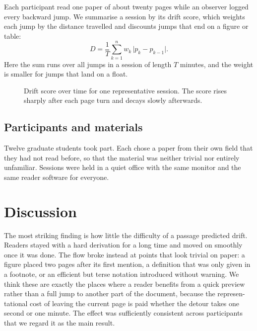 \documentclass[11pt]{article}
\begin{document}
Each participant read one paper of about twenty pages while an observer
logged every backward jump. We summarise a session by its drift score, which
weights each jump by the distance travelled and discounts jumps that end on a
figure or table:
\begin{equation}
  D = \frac{1}{T}\sum_{k=1}^{n} w_k \,\lvert p_k - p_{k-1}\rvert .
  \label{eq:drift}
\end{equation}
Here the sum runs over all jumps in a session of length $T$ minutes, and the
weight is smaller for jumps that land on a float.

\begin{figure}[H]
  \centering
  \caption{Drift score over time for one representative session. The score
  rises sharply after each page turn and decays slowly afterwards.}
  \label{fig:drift}
\end{figure}

\subsection{Participants and materials}

Twelve graduate students took part. Each chose a paper from their own field
that they had not read before, so that the material was neither trivial nor
entirely unfamiliar. Sessions were held in a quiet office with the same
monitor and the same reader software for everyone.

\clearpage

\section{Discussion}

The most striking finding is how little the difficulty of a passage predicted
drift. Readers stayed with a hard derivation for a long time and moved on
smoothly once it was done. The flow broke instead at points that look trivial
on paper: a figure placed two pages after its first mention, a definition that
was only given in a footnote, or an efficient but terse notation introduced
without warning. We think these are exactly the places where a reader
benefits from a quick preview rather than a full jump to another part of the
document, because the represen-\linebreak tational cost of leaving the current page is paid whether
the detour takes one second or one minute. The effect was sufficiently
consistent across participants that we regard it as the main result.
\end{document}
